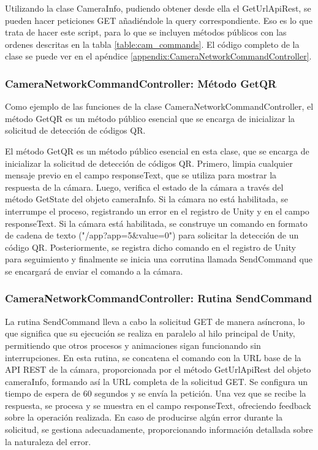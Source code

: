 Utilizando la clase CameraInfo, pudiendo obtener desde ella el GetUrlApiRest, se pueden hacer peticiones GET añadiéndole la query correspondiente. Eso es lo que trata de hacer este script, para lo que se incluyen métodos públicos con las ordenes descritas en la tabla \ref{table:cam_commands}. El código completo de la clase se puede ver en el apéndice \ref{appendix:CameraNetworkCommandController}.

\subsubsection{CameraNetworkCommandController: Método GetQR}

Como ejemplo de las funciones de la clase CameraNetworkCommandController, el método GetQR es un método público esencial que se encarga de inicializar la solicitud de detección de códigos QR.



El método GetQR es un método público esencial en esta clase, que se encarga de inicializar la solicitud de detección de códigos QR. Primero, limpia cualquier mensaje previo en el campo responseText, que se utiliza para mostrar la respuesta de la cámara. Luego, verifica el estado de la cámara a través del método GetState del objeto cameraInfo. Si la cámara no está habilitada, se interrumpe el proceso, registrando un error en el registro de Unity y en el campo responseText. Si la cámara está habilitada, se construye un comando en formato de cadena de texto ("/app?app=5\&value=0") para solicitar la detección de un código QR. Posteriormente, se registra dicho comando en el registro de Unity para seguimiento y finalmente se inicia una corrutina llamada SendCommand que se encargará de enviar el comando a la cámara.

\subsubsection{CameraNetworkCommandController: Rutina SendCommand}

La rutina SendCommand lleva a cabo la solicitud GET de manera asíncrona, lo que significa que su ejecución se realiza en paralelo al hilo principal de Unity, permitiendo que otros procesos y animaciones sigan funcionando sin interrupciones. En esta rutina, se concatena el comando con la URL base de la API REST de la cámara, proporcionada por el método GetUrlApiRest del objeto cameraInfo, formando así la URL completa de la solicitud GET. Se configura un tiempo de espera de 60 segundos y se envía la petición. Una vez que se recibe la respuesta, se procesa y se muestra en el campo responseText, ofreciendo feedback sobre la operación realizada. En caso de producirse algún error durante la solicitud, se gestiona adecuadamente, proporcionando información detallada sobre la naturaleza del error.



